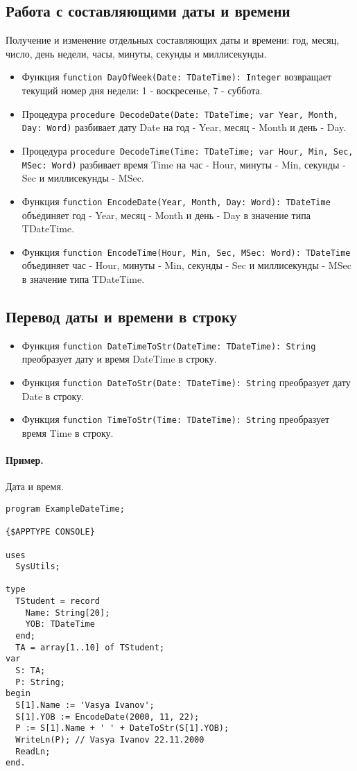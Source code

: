 \documentclass[12pt,a4paper]{report}
\begin{document}
\subsection*{Работа с составляющими даты и времени}
Получение и изменение отдельных составляющих даты и времени: год, месяц, число, день недели, часы, минуты, секунды и миллисекунды.
\begin{itemize}
\item Функция \texttt{function DayOfWeek(Date: TDateTime): Integer} возвращает текущий номер дня недели: 1 - воскресенье, 7 - суббота.
\item Процедура \texttt{procedure DecodeDate(Date: TDateTime; var Year, Month, Day: Word)} разбивает дату Date на год - Year, месяц - Month и день - Day.
\item Процедура \texttt{procedure DecodeTime(Time: TDateTime; var Hour, Min, Sec, MSec: Word)} разбивает время Time на час - Hour, минуты - Min, секунды - Sec и миллисекунды - MSec.
\item Функция \texttt{function EncodeDate(Year, Month, Day: Word): TDateTime} объединяет год - Year, месяц - Month и день - Day в значение типа TDateTime.
\item Функция \texttt{function EncodeTime(Hour, Min, Sec, MSec: Word): TDateTime} объединяет час - Hour, минуты - Min, секунды - Sec и миллисекунды - MSec в значение типа TDateTime.
\end{itemize}
\subsection*{Перевод даты и времени в строку}
\begin{itemize}
\item Функция \texttt{function DateTimeToStr(DateTime: TDateTime): String} преобразует дату и время DateTime в строку.
\item Функция \texttt{function DateToStr(Date: TDateTime): String} преобразует дату Date в строку.
\item Функция \texttt{function TimeToStr(Time: TDateTime): String} преобразует время Time в строку.
\end{itemize}

\paragraph*{Пример.} Дата и время.
\begin{verbatim}
program ExampleDateTime;

{$APPTYPE CONSOLE}

uses
  SysUtils;

type
  TStudent = record
    Name: String[20];
    YOB: TDateTime
  end;
  TA = array[1..10] of TStudent;
var
  S: TA;
  P: String;
begin
  S[1].Name := 'Vasya Ivanov';
  S[1].YOB := EncodeDate(2000, 11, 22);
  P := S[1].Name + ' ' + DateToStr(S[1].YOB);
  WriteLn(P); // Vasya Ivanov 22.11.2000
  ReadLn;
end.
\end{verbatim}
\end{document}
